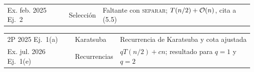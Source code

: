 {\begin{tabularx}{\textwidth}{@{}>{\raggedright\arraybackslash}p{2.95cm}>{\raggedright\arraybackslash}p{2.75cm}>{\raggedright\arraybackslash}X@{}}
Ex. feb. 2025 Ej.~2 & Selección & Faltante con \textsc{separar}; $T(n/2)+\mathcal{O}(n)$, cita a (5.5) \\
\end{tabularx}\par\vspace{-\parskip}
\begin{tabularx}{\textwidth}{@{}>{\raggedright\arraybackslash}p{2.95cm}>{\raggedright\arraybackslash}p{2.75cm}>{\raggedright\arraybackslash}X@{}}
2P 2025 Ej.~1(a) & Karatsuba & Recurrencia de Karatsuba y cota ajustada \\
Ex. jul. 2026 Ej.~1(e) & Recurrencias & $qT(n/2)+cn$; resultado para $q=1$ y $q=2$ \\
\bottomrule
\end{tabularx}
}
